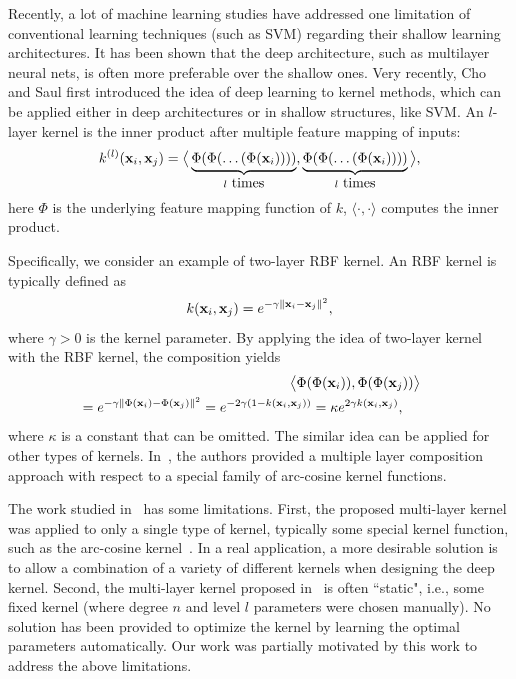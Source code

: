 Recently, a lot of machine learning studies have addressed one limitation of conventional learning techniques (such as SVM) regarding their shallow
learning architectures. It has been shown that the deep architecture, such as multilayer neural nets, is often more preferable over the shallow ones.
Very recently, Cho and Saul \cite{nips/ChoS09,nc/ChoS10} first introduced the idea of deep learning to kernel methods,
which can be applied either in deep architectures or in shallow structures, like SVM.
An $l$-layer kernel is the inner product after multiple feature mapping of inputs:
\begin{eqnarray*}
k^{(l)}(\x_i, \x_j) =\big\langle \underbrace{\Phi(\Phi(\ldots(\Phi(\x_i))))}_{l\mbox{ times}},
 \underbrace{\Phi(\Phi(\ldots(\Phi(\x_i))))}_{l\mbox{ times}} \big\rangle, \label{eqn:deep-kernel}
\end{eqnarray*}
here $\Phi$ is the underlying feature mapping function of $k$,
$\langle\cdot,\cdot\rangle$ computes the inner product.

Specifically, we consider an example of two-layer RBF kernel. An RBF kernel is typically defined as
\[k({\bf x}_i, {\bf x}_j) = e^{-\gamma\|{\bf x}_i - {\bf x}_j\|^2},\]
where $\gamma > 0$ is the kernel parameter. By applying the idea of two-layer
kernel with the RBF kernel, the composition yields
\begin{eqnarray}
\hspace{-0.3in}&&\big\langle\Phi(\Phi(\x_i)), \Phi(\Phi(\x_j))\big\rangle \nonumber\\
\hspace{-0.3in}&&=e^{-\gamma\| \Phi(\x_i) - \Phi(\x_j) \|^2} = e^{-2\gamma(1 - k(\x_i, \x_j))} = \kappa e^{2\gamma k(\x_i, \x_j)},\quad\;
\end{eqnarray}
where $\kappa$ is a constant that can be omitted. The similar idea can be applied for
other types of kernels. In~\cite{nips/ChoS09,nc/ChoS10}, the authors provided a multiple layer composition approach with respect to a special family of arc-cosine kernel functions.

\begin{remark}
The work studied in~\cite{nips/ChoS09} has some limitations. First, the proposed multi-layer kernel was applied to only a single type of kernel, typically some special kernel function, such as the arc-cosine kernel~\cite{nips/ChoS09}. In a real application, a more desirable solution is to
allow a combination of a variety of different kernels when designing the deep kernel. Second, the multi-layer kernel proposed in~\cite{nips/ChoS09}
is often ``static", i.e., some fixed kernel (where degree $n$ and level $l$ parameters were chosen manually). No solution has been provided to optimize the kernel by learning the optimal parameters automatically. Our work was partially motivated by this work to address the above limitations.
\end{remark}

